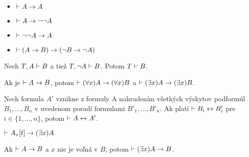 \begin{veta}
    \noindent
    \begin{itemize}
        \item $\vdash A \rightarrow A$
        \item $\vdash A \rightarrow \neg \neg A$
        \item $\vdash \neg \neg A \rightarrow A$
        \item $\vdash (A \rightarrow B) \rightarrow (\neg B \rightarrow \neg A)$
    \end{itemize}
\end{veta}

\begin{lema}
   Nech $T,A \vdash B$ a tiež $T, \neg A \vdash B$. Potom
   $T \vdash B$.
\end{lema}

\begin{lema}
    Ak je $\vdash A \rightarrow B$, potom
    $\vdash (\forall x)A \rightarrow (\forall x) B$ a
    $\vdash (\exists x)A \rightarrow (\exists x)B$.
\end{lema}

\begin{veta}[O ekvivalencii]
    Nech formula $A'$ vznikne z formuly A nahradením všetkých výskytov 
    podformúl $B_1,\dots ,B_n$ v uvedenom poradí formulami 
    $B'_1, \dots, B'_n$. Ak platí $\vdash B_i \leftrightarrow B'_i$ pre
    $i \in \{1,\dots,n\}$, potom $\vdash A \leftrightarrow A'$.
\end{veta}

\begin{lema}
    $\vdash A_x[t] \rightarrow (\exists x) A$
\end{lema}

\begin{lema}
    Ak $\vdash A \rightarrow B$ a $x$ nie je voľná v $B$, potom
    $\vdash (\exists x) A \rightarrow B$.
\end{lema}
